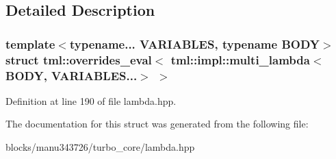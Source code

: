 \subsection{Detailed Description}
\subsubsection*{template$<$typename... V\+A\+R\+I\+A\+B\+L\+E\+S, typename B\+O\+D\+Y$>$struct tml\+::overrides\+\_\+eval$<$ tml\+::impl\+::multi\+\_\+lambda$<$ B\+O\+D\+Y, V\+A\+R\+I\+A\+B\+L\+E\+S...$>$ $>$}



Definition at line 190 of file lambda.\+hpp.



The documentation for this struct was generated from the following file\+:\begin{DoxyCompactItemize}
\item 
blocks/manu343726/turbo\+\_\+core/lambda.\+hpp\end{DoxyCompactItemize}
